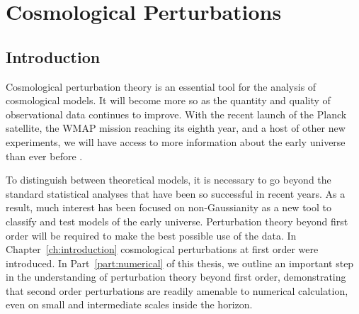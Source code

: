 \renewcommand{\CVSrevision}{\version$Id: perts.tex,v 1.33 2009/11/30 12:11:02 ith Exp $}
\chapter{Cosmological Perturbations}
\label{ch:perts}

\section{Introduction}
\label{sec:intro-numerical}

Cosmological perturbation theory is an essential tool for the analysis
of cosmological models. It will become more so as the quantity and quality
of observational
data continues to improve. With the recent launch of the
Planck satellite, the WMAP mission reaching its eighth
year, and a host of other new experiments, we will have access to more
information about the early universe than ever before
\cite{planck,Komatsu:2008hk}.

To distinguish between theoretical models, 
it is necessary to go beyond the standard statistical analyses that
have been so successful in recent years. As a result, much interest
has been focused on non-Gaussianity as a new tool to classify and
test models of the early universe. Perturbation theory beyond first
order will be required to make the best possible use of 
the data. In Chapter~\ref{ch:introduction} cosmological perturbations at first order
were introduced.  In Part~\ref{part:numerical} of this thesis, we outline an
important
step in the understanding of perturbation theory beyond first order, demonstrating
that second order perturbations are readily amenable to numerical
calculation, even on small and intermediate scales inside the horizon.


